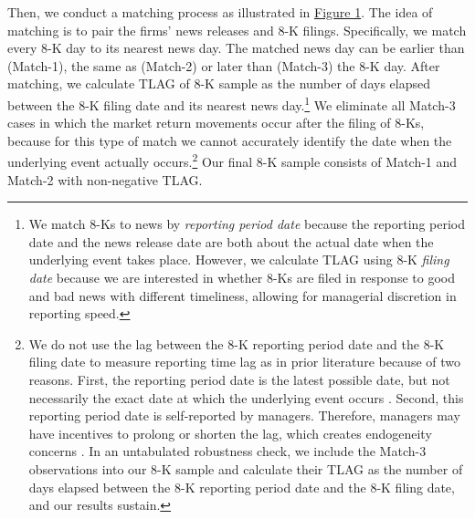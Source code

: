 \documentclass[letterpaper,11pt]{article}
\begin{document}
\begin{spacing}{1.5}
Then, we conduct a matching process as illustrated in \hyperref[fig1]{Figure 1}. The idea of matching is to pair the firms' news releases and 8-K filings. Specifically, we match every 8-K day to its nearest news day. The matched news day can be earlier than (Match-1), the same as (Match-2) or later than (Match-3) the 8-K day. After matching, we calculate TLAG of 8-K sample as the number of days elapsed between the 8-K filing date and its nearest news day.\footnote{We match 8-Ks to news by \textit{reporting period date} because the reporting period date and the news release date are both about the actual date when the underlying event takes place. However, we calculate TLAG using 8-K \textit{filing date} because we are interested in whether 8-Ks are filed in response to good and bad news with different timeliness, allowing for managerial discretion in reporting speed.} We eliminate all Match-3 cases in which the market return movements occur after the filing of 8-Ks, because for this type of match we cannot accurately identify the date when the underlying event actually occurs.\footnote{We do not use the lag between the 8-K reporting period date and the 8-K filing date to measure reporting time lag as in prior literature \cite{carterRelevanceForm8K1999, niessnerStrategicDisclosureTiming2015, chapmanInformationOverloadDisclosure2019} because of two reasons. First, the reporting period date is the latest possible date, but not necessarily the exact date at which the underlying event occurs \cite{secFinalRuleAdditional2004}. Second, this reporting period date is self-reported by managers. Therefore, managers may have incentives to prolong or shorten the lag, which creates endogeneity concerns \cite{chapmanInformationOverloadDisclosure2019}. In an untabulated robustness check, we include the Match-3 observations into our 8-K sample and calculate their TLAG as the number of days elapsed between the 8-K reporting period date and the 8-K filing date, and our results sustain.} Our final 8-K sample consists of Match-1 and Match-2 with non-negative TLAG. 


\end{spacing}
\end{document}
